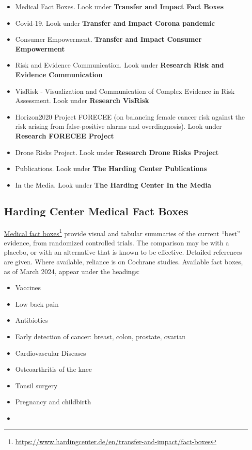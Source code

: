\documentclass[
  10pt,
  b5paper]{book}
\providecommand{\tightlist}{%
  \setlength{\itemsep}{0pt}\setlength{\parskip}{0pt}}
\begin{document}
\begin{itemize}
\tightlist
\item
  Medical Fact Boxes. Look under \textbf{Transfer and Impact \textbar{} Fact Boxes}
\item
  Covid-19. Look under \textbf{Transfer and Impact \textbar{} Corona pandemic}
\item
  Consumer Empowerment. \textbf{Transfer and Impact \textbar{} Consumer
  Empowerment}
\item
  Risk and Evidence Communication. Look under \textbf{Research \textbar{} Risk and
  Evidence Communication}
\item
  VisRisk - Visualization and Communication of Complex Evidence in
  Risk Assessment. Look under \textbf{Research \textbar{} VisRisk}
\item
  Horizon2020 Project FORECEE (on balancing female cancer risk against
  the risk arising from false-positive alarms and overdiagnosis). Look
  under \textbf{Research \textbar{} FORECEE Project}
\item
  Drone Risks Project. Look under \textbf{Research \textbar{} Drone Risks Project}
\item
  Publications. Look under \textbf{The Harding Center \textbar{} Publications}
\item
  In the Media. Look under \textbf{The Harding Center \textbar{} In the Media}
\end{itemize}

\hypertarget{harding-center-medical-fact-boxes}{%
\subsection*{Harding Center Medical Fact Boxes}\label{harding-center-medical-fact-boxes}}

\href{https://www.hardingcenter.de/en/transfer-and-impact/fact-boxes}{Medical fact
boxes}\footnote{\url{https://www.hardingcenter.de/en/transfer-and-impact/fact-boxes}}
provide visual and tabular summaries of the current ``best'' evidence,
from randomized controlled trials. The comparison may be with a placebo,
or with an alternative that is known to be effective. Detailed
references are given. Where available, reliance is on Cochrane studies.
Available fact boxes, as of March 2024, appear under the headings:

\begin{itemize}
\tightlist
\item
  Vaccines
\item
  Low back pain
\item
  Antibiotics
\item
  Early detection of cancer: breast, colon, prostate, ovarian
\item
  Cardiovascular Diseases
\item
  Osteoarthritis of the knee
\item
  Tonsil surgery
\item
  Pregnancy and childbirth
\item
\end{itemize}
\end{document}
